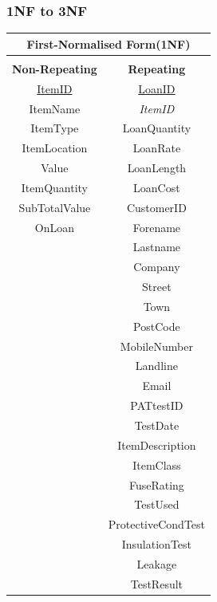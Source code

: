 \subsubsection{1NF to 3NF}

\begin{center}
    \begin{tabular}{|c|c|}
        \hline
        \multicolumn{2}{|c|}{\textbf{First-Normalised Form(1NF)}}\\ \hline
        \multicolumn{2}{|c|}{ }\\ \hline
        \textbf{Non-Repeating} & \textbf{Repeating}\\ \hline
        \underline{ItemID }& \underline{LoanID }\\ \hline
        ItemName & \emph{ItemID} \\ \hline
        ItemType & LoanQuantity \\ \hline
        ItemLocation & LoanRate\\ \hline
        Value & LoanLength \\ \hline
        ItemQuantity & LoanCost \\ \hline
        SubTotalValue & CustomerID \\ \hline
        OnLoan &  Forename \\ \hline
         & Lastname \\ \hline
         & Company \\ \hline
         & Street \\ \hline
         & Town \\ \hline
         & PostCode \\ \hline
         & MobileNumber \\ \hline
         & Landline \\ \hline
         & Email \\ \hline
         & PATtestID \\ \hline
         & TestDate \\ \hline
         & ItemDescription \\ \hline
         & ItemClass \\ \hline
         & FuseRating \\ \hline
         & TestUsed \\ \hline
         & ProtectiveCondTest \\ \hline
         & InsulationTest \\ \hline
         & Leakage  \\ \hline
         & TestResult \\ \hline
    \end{tabular}
\end{center}

